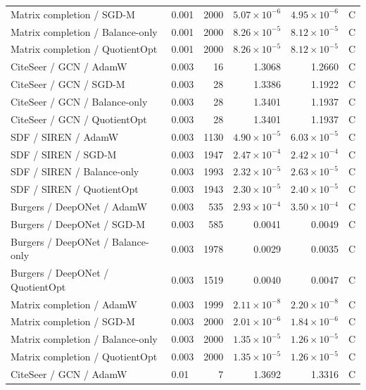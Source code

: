\begin{longtable}{p{.34\linewidth}p{.09\linewidth}rrrr}
Matrix completion / SGD-M & 0.001 & 2000 & $5.07\!\times\!10^{-6}$ & $4.95\!\times\!10^{-6}$ & C\\
Matrix completion / Balance-only & 0.001 & 2000 & $8.26\!\times\!10^{-5}$ & $8.12\!\times\!10^{-5}$ & C\\
\rowcolor{oursbg}Matrix completion / QuotientOpt & 0.001 & 2000 & $8.26\!\times\!10^{-5}$ & $8.12\!\times\!10^{-5}$ & C\\
CiteSeer / GCN / AdamW & 0.003 & 16 & 1.3068 & 1.2660 & C\\
CiteSeer / GCN / SGD-M & 0.003 & 28 & 1.3386 & 1.1922 & C\\
CiteSeer / GCN / Balance-only & 0.003 & 28 & 1.3401 & 1.1937 & C\\
\rowcolor{oursbg}CiteSeer / GCN / QuotientOpt & 0.003 & 28 & 1.3401 & 1.1937 & C\\
SDF / SIREN / AdamW & 0.003 & 1130 & $4.90\!\times\!10^{-5}$ & $6.03\!\times\!10^{-5}$ & C\\
SDF / SIREN / SGD-M & 0.003 & 1947 & $2.47\!\times\!10^{-4}$ & $2.42\!\times\!10^{-4}$ & C\\
SDF / SIREN / Balance-only & 0.003 & 1993 & $2.32\!\times\!10^{-5}$ & $2.63\!\times\!10^{-5}$ & C\\
\rowcolor{oursbg}SDF / SIREN / QuotientOpt & 0.003 & 1943 & $2.30\!\times\!10^{-5}$ & $2.40\!\times\!10^{-5}$ & C\\
Burgers / DeepONet / AdamW & 0.003 & 535 & $2.93\!\times\!10^{-4}$ & $3.50\!\times\!10^{-4}$ & C\\
Burgers / DeepONet / SGD-M & 0.003 & 585 & 0.0041 & 0.0049 & C\\
Burgers / DeepONet / Balance-only & 0.003 & 1978 & 0.0029 & 0.0035 & C\\
\rowcolor{oursbg}Burgers / DeepONet / QuotientOpt & 0.003 & 1519 & 0.0040 & 0.0047 & C\\
Matrix completion / AdamW & 0.003 & 1999 & $2.11\!\times\!10^{-8}$ & $2.20\!\times\!10^{-8}$ & C\\
Matrix completion / SGD-M & 0.003 & 2000 & $2.01\!\times\!10^{-6}$ & $1.84\!\times\!10^{-6}$ & C\\
Matrix completion / Balance-only & 0.003 & 2000 & $1.35\!\times\!10^{-5}$ & $1.26\!\times\!10^{-5}$ & C\\
\rowcolor{oursbg}Matrix completion / QuotientOpt & 0.003 & 2000 & $1.35\!\times\!10^{-5}$ & $1.26\!\times\!10^{-5}$ & C\\
CiteSeer / GCN / AdamW & 0.01 & 7 & 1.3692 & 1.3316 & C\\

\end{longtable}

